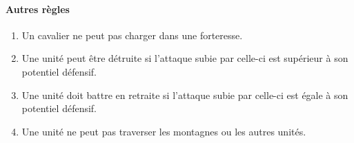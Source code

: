 		\paragraph{Autres règles}
		\begin{enumerate}
		\item Un cavalier ne peut pas charger dans une forteresse.
		\item Une unité peut être détruite si l'attaque subie par celle-ci est supérieur à son potentiel défensif.
		\item Une unité doit battre en retraite si l'attaque subie par celle-ci est égale à son potentiel défensif.
		\item Une unité ne peut pas traverser les montagnes ou les autres unités.
		\end{enumerate}
		\clearpage